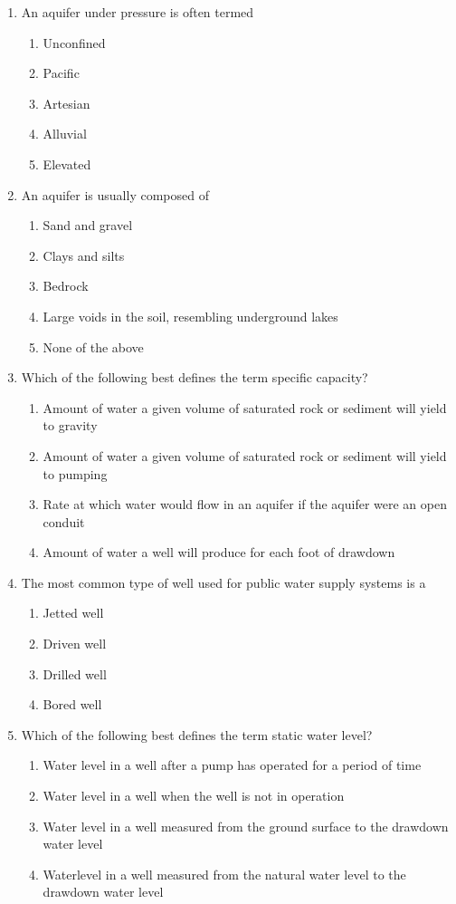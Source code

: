 \documentclass{article}
\begin{document}
\begin{enumerate}
\item An aquifer under pressure is often termed
\begin{enumerate}
\item Unconfined
\item Pacific
\item Artesian
\item Alluvial
\item Elevated
\end{enumerate}

\item An aquifer is usually composed of
\begin{enumerate}
\item Sand and gravel 
\item Clays and silts
\item Bedrock
\item Large voids in the soil, resembling underground lakes
\item None of the above
\end{enumerate}

\item Which of the following best defines the term specific capacity?
\begin{enumerate}
\item Amount of water a given volume of saturated rock or sediment will yield to gravity
\item Amount of water a given volume of saturated rock or sediment will yield to pumping
\item Rate at which water would flow in an aquifer if the aquifer were an open conduit
\item Amount of water a well will produce for each foot of drawdown
\end{enumerate}

\item The most common type of well used for public water supply systems is a
\begin{enumerate}
\item Jetted well
\item Driven well
\item Drilled well
\item Bored well
\end{enumerate}

\item Which of the following best defines the term static water level?
\begin{enumerate}
\item Water level in a well after a pump has operated for a period of time
\item Water level in a well when the well is not in operation
\item Water level in a well measured from the ground surface to the drawdown water level
\item Waterlevel in a well measured from the natural water level to the drawdown water level
\end{enumerate}


\end{enumerate}
\end{document}
